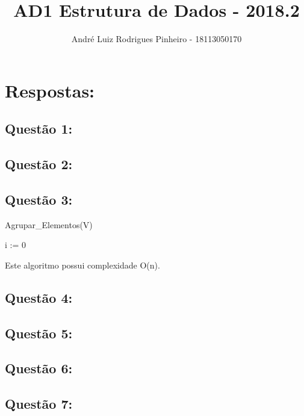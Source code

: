 \documentclass[a4paper,11pt]{article}
\title{AD1 Estrutura de Dados - 2018.2}
\author{André Luiz Rodrigues Pinheiro - 18113050170}
\begin{document}
\maketitle

\section*{Respostas:}

\subsection*{Questão 1:}

\subsection*{Questão 2:}

\subsection*{Questão 3:}

\begin{algorithm}
\caption{Agrupar\_Elementos(V)}
i := 0\\
\end{algorithm}

Este algoritmo possui complexidade O(n).

\subsection*{Questão 4:}

\subsection*{Questão 5:}

\subsection*{Questão 6:}

\subsection*{Questão 7:}
\end{document}
